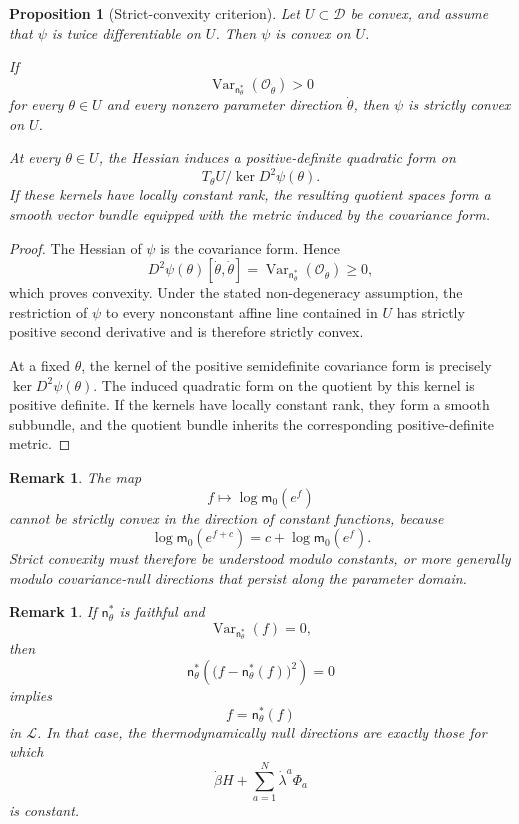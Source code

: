 \documentclass[10pt,a4paper]{amsart}
\newtheorem{Proposition}[Theorem]{Proposition}
\newtheorem{rem}[Theorem]{Remark}
\begin{document}
\begin{Proposition}[Strict-convexity criterion]
\label{prop:strict-convexity}
Let $U\subset\mathcal D$ be convex, and assume that $\psi$ is twice
differentiable on $U$. Then $\psi$ is convex on $U$.

If
\[
\operatorname{Var}_{\mathsf n_\theta^*}
(\mathcal O_{\dot\theta})>0
\]
for every $\theta\in U$ and every nonzero parameter direction
$\dot\theta$, then $\psi$ is strictly convex on $U$.

At every $\theta\in U$, the Hessian induces a positive-definite
quadratic form on
\[
T_\theta U\big/\ker D^2\psi(\theta).
\]
If these kernels have locally constant rank, the resulting quotient
spaces form a smooth vector bundle equipped with the metric induced by
the covariance form.
\end{Proposition}

\begin{proof}
The Hessian of $\psi$ is the covariance form. Hence
\[
D^2\psi(\theta)[\dot\theta,\dot\theta]
=
\operatorname{Var}_{\mathsf n_\theta^*}
(\mathcal O_{\dot\theta})
\geq 0,
\]
which proves convexity. Under the stated non-degeneracy assumption, the
restriction of $\psi$ to every nonconstant affine line contained in
$U$ has strictly positive second derivative and is therefore strictly
convex.

At a fixed $\theta$, the kernel of the positive semidefinite covariance
form is precisely $\ker D^2\psi(\theta)$. The induced quadratic form on
the quotient by this kernel is positive definite. If the kernels have
locally constant rank, they form a smooth subbundle, and the quotient
bundle inherits the corresponding positive-definite metric.
\end{proof}

\begin{rem}
The map
\[
f\longmapsto\log\mathsf m_0(e^f)
\]
cannot be strictly convex in the direction of constant functions,
because
\[
\log\mathsf m_0(e^{f+c})
=
c+\log\mathsf m_0(e^f).
\]
Strict convexity must therefore be understood modulo constants, or more
generally modulo covariance-null directions that persist along the
parameter domain.
\end{rem}

\begin{rem}
If $\mathsf n_\theta^*$ is faithful and
\[
\operatorname{Var}_{\mathsf n_\theta^*}(f)=0,
\]
then
\[
\mathsf n_\theta^*
\left(
\bigl(f-\mathsf n_\theta^*(f)\bigr)^2
\right)
=
0
\]
implies
\[
f=\mathsf n_\theta^*(f)
\]
in $\mathcal L$. In that case, the thermodynamically null directions
are exactly those for which
\[
\dot\beta H+\sum_{a=1}^{N}\dot\lambda^a\Phi_a
\]
is constant.
\end{rem}
\end{document}
